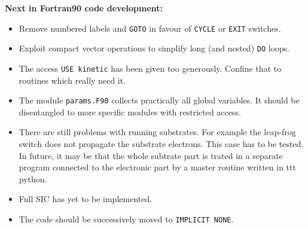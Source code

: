 \documentclass[12pt]{article}
\begin{document}
\begin{enumerate}
{\Large\bf Next in Fortran90 code development:}
\begin{itemize}
  \item Remove numbered labels and {\tt GOTO} in favour of
        {\tt CYCLE} or {\tt EXIT} switches.
  \item Exploit compact vector operations to simplify
        long (and nested) {\tt DO} loops.
  \item The access {\tt USE kinetic} has been given too generously.
        Confine that to routines which really need it.
  \item The module {\tt params.F90} collects practically all
        global variables. It should be disentangled to more
        specific modules with restricted access. 
  \item There are still problems with running substrates.
        For example the leap-frog switch does not propagate the
        substrate electrons.
        This case has to be tested.
        \\
        In future, it may be that the whole subtrate part
        is trated in a separate program connected to the electronic
        part by a master routine written in {ttt python}.
  \item Full SIC has yet to be implemented.
  \item The code should be successively moved to {\tt IMPLICIT NONE}.
\end{itemize}

\newpage


\end{enumerate}
\end{document}

